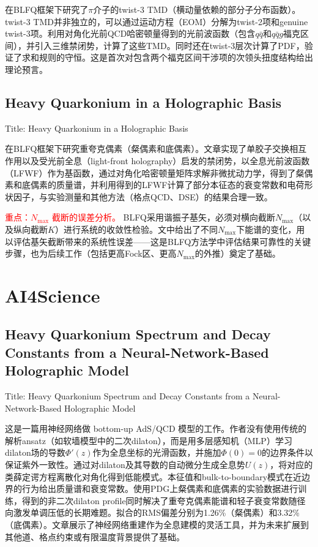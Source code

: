 \documentclass{article}
\begin{document}
在BLFQ框架下研究了$\pi$介子的twist-3 TMD（横动量依赖的部分子分布函数）。twist-3 TMD并非独立的，可以通过运动方程（EOM）分解为twist-2项和genuine twist-3项。利用对角化光前QCD哈密顿量得到的光前波函数（包含$q\bar{q}$和$q\bar{q}g$福克区间），并引入三维禁闭势，计算了这些TMD。同时还在twist-3层次计算了PDF，验证了求和规则的守恒。这是首次对包含两个福克区间干涉项的次领头扭度结构给出理论预言。


\subsection{Heavy Quarkonium in a Holographic Basis}

Title: \quad Heavy Quarkonium in a Holographic Basis \cite{Li_2016}

在BLFQ框架下研究重夸克偶素（粲偶素和底偶素）。文章实现了单胶子交换相互作用以及受光前全息（light-front holography）启发的禁闭势，以全息光前波函数（LFWF）作为基函数，通过对角化哈密顿量矩阵求解非微扰动力学，得到了粲偶素和底偶素的质量谱，并利用得到的LFWF计算了部分本征态的衰变常数和电荷形状因子，与实验测量和其他方法（格点QCD、DSE）的结果合理一致。

\textcolor{red}{重点：$N_{\text{max}}$ 截断的误差分析。} BLFQ采用谐振子基矢，必须对横向截断$N_{\text{max}}$（以及纵向截断$K$）进行系统的收敛性检验。文中给出了不同$N_{\text{max}}$下能谱的变化，用以评估基矢截断带来的系统性误差——这是BLFQ方法学中评估结果可靠性的关键步骤，也为后续工作（包括更高Fock区、更高$N_{\text{max}}$的外推）奠定了基础。


\section{AI4Science}

\subsection{Heavy Quarkonium Spectrum and Decay Constants from a Neural-Network-Based Holographic Model}

Title: \quad Heavy Quarkonium Spectrum and Decay Constants from a Neural-Network-Based Holographic Model \cite{zhang2026heavyquarkonium}

这是一篇用神经网络做 bottom-up AdS/QCD 模型的工作。作者没有使用传统的解析ansatz（如软墙模型中的二次dilaton），而是用多层感知机（MLP）学习dilaton场的导数$\Phi'(z)$作为全息坐标的光滑函数，并施加$\Phi(0)=0$的边界条件以保证紫外一致性。通过对dilaton及其导数的自动微分生成全息势$U(z)$，将对应的类薛定谔方程离散化对角化得到低能模式。本征值和bulk-to-boundary模式在近边界的行为给出质量谱和衰变常数。使用PDG上粲偶素和底偶素的实验数据进行训练，得到的非二次dilaton profile同时解决了重夸克偶素能谱和轻子衰变常数随径向激发单调压低的长期难题。拟合的RMS偏差分别为1.26\%（粲偶素）和3.32\%（底偶素）。文章展示了神经网络重建作为全息建模的灵活工具，并为未来扩展到其他道、格点约束或有限温度背景提供了基础。
\end{document}
